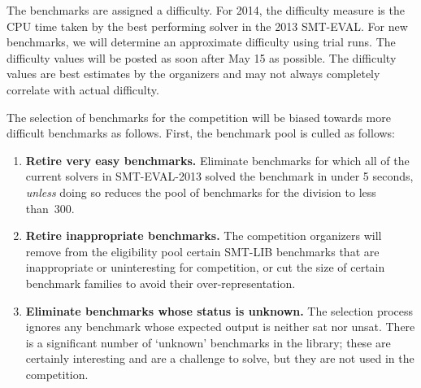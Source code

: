 \documentclass[12pt]{article}
\begin{document}

The benchmarks are assigned a difficulty. For 2014, the difficulty measure is the
CPU time taken by the best performing solver in the 2013 SMT-EVAL. 
 For new benchmarks, we will determine an approximate difficulty
using trial runs.
The difficulty values will be posted 
as soon after May 15 as possible.
The difficulty values are best estimates by the organizers and may not always completely correlate with actual difficulty.

The selection of benchmarks for the competition will be biased towards more difficult benchmarks
as follows. First, the benchmark pool is culled as follows:
\begin{enumerate}

\item \textbf{Retire very easy benchmarks.} %
  Eliminate benchmarks for which all of the current solvers in SMT-EVAL-2013
  solved the benchmark in under 5 seconds,
  \emph{unless} doing so reduces the pool of
    benchmarks for the division to less than~300.

\item \textbf{Retire inappropriate benchmarks.} %
  The competition organizers will remove from the eligibility pool
  certain SMT-LIB benchmarks that are inappropriate or uninteresting
  for competition, or cut the size of certain benchmark families to
  avoid their over-representation.

\item \textbf{Eliminate benchmarks whose status is unknown.} %
  The selection process ignores any benchmark whose expected output is neither sat nor unsat. There is a significant number of `unknown' benchmarks in the library; these are certainly interesting and are a challenge to solve, but they are not used in the competition.

\end{enumerate}
\end{document}
